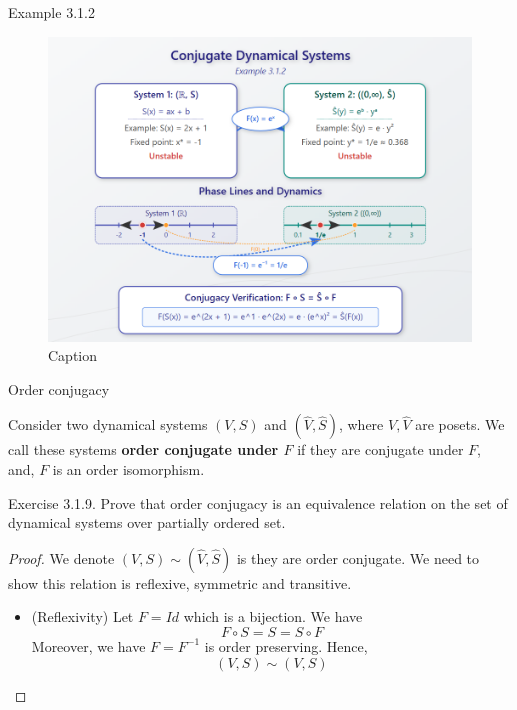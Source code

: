 \begin{frame}{Example 3.1.2}
   \begin{figure}
       \centering
       \includegraphics[width=0.68\linewidth]{image/Example 3.1.2.png}
       \caption{Caption}
       \label{fig:enter-label}
   \end{figure} 
\end{frame}

\begin{frame}{Order conjugacy}
\begin{definition}
    Consider two dynamical systems $(V,S)$ and $(\hat V, \hat S)$, where $V,\hat V$ are posets. We call these systems \textbf{order conjugate under $F$} if they are conjugate under $F$, and, $F$ is an order isomorphism.
\end{definition}
\end{frame}

\begin{frame}{Exercise 3.1.9.}
Prove that order conjugacy is an equivalence relation on the set of dynamical systems over partially ordered set.
\begin{proof}
    We denote $(V,S)\sim (\hat{V},\hat S)$ is they are order conjugate. We need to show this relation is reflexive, symmetric and transitive. 
    \begin{itemize}
        \item (Reflexivity) Let $F=Id$ which is a bijection. We have 
        $$
        F\circ S = S = S\circ F 
        $$
        Moreover, we have $F = F^{-1}$ is order preserving. Hence, 
        $$
        (V,S) \sim (V,S)
        $$
    \end{itemize}
\end{proof}
\end{frame}

